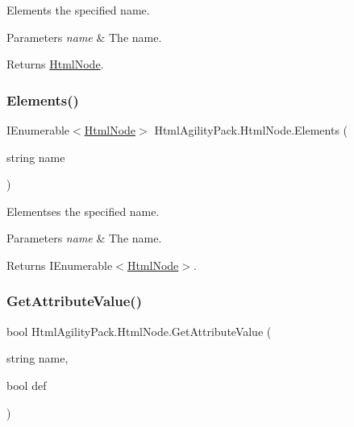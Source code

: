 Elements the specified name. 


\begin{DoxyParams}{Parameters}
{\em name} & The name.\\
\hline
\end{DoxyParams}
\begin{DoxyReturn}{Returns}
\hyperlink{class_html_agility_pack_1_1_html_node}{Html\+Node}.
\end{DoxyReturn}
\mbox{\label{class_html_agility_pack_1_1_html_node_a601bdf7d0b7e6a266c3f5540fdd9affc}} 
\subsubsection{\texorpdfstring{Elements()}{Elements()}}
{\footnotesize\ttfamily I\+Enumerable$<$\hyperlink{class_html_agility_pack_1_1_html_node}{Html\+Node}$>$ Html\+Agility\+Pack.\+Html\+Node.\+Elements (\begin{DoxyParamCaption}\item[{string}]{name }\end{DoxyParamCaption})\hspace{0.3cm}{\ttfamily [inline]}}



Elementses the specified name. 


\begin{DoxyParams}{Parameters}
{\em name} & The name.\\
\hline
\end{DoxyParams}
\begin{DoxyReturn}{Returns}
I\+Enumerable$<$\hyperlink{class_html_agility_pack_1_1_html_node}{Html\+Node}$>$.
\end{DoxyReturn}
\mbox{\label{class_html_agility_pack_1_1_html_node_a7c92c891c52dc9e5439ab7aa03a455b0}} 
\subsubsection{\texorpdfstring{Get\+Attribute\+Value()}{GetAttributeValue()}\hspace{0.1cm}{\footnotesize\ttfamily [1/3]}}
{\footnotesize\ttfamily bool Html\+Agility\+Pack.\+Html\+Node.\+Get\+Attribute\+Value (\begin{DoxyParamCaption}\item[{string}]{name,  }\item[{bool}]{def }\end{DoxyParamCaption})\hspace{0.3cm}{\ttfamily [inline]}}



